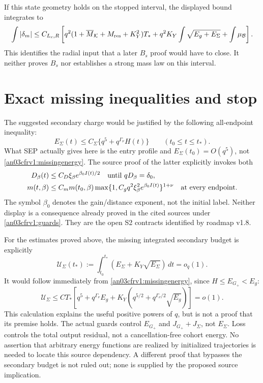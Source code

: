 \documentclass[11pt]{article}
\theoremstyle{remark}\newtheorem{remark}[proposition]{Remark}
\newcommand{\dd}{\,d}
\newcommand{\Gp}{G_+}
\newcommand{\KK}{\mathcal K}
\newcommand{\BB}{\mathcal B}
\begin{document}
If this state geometry holds on the stopped interval, the
displayed bound integrates to
\begin{equation}
 \int|\delta_m|\le C_{L_c,R}\left[
 q^2(1+\overline M_{\KK}+M_{\rm res}+K_Y^2)T_*
 +q^2K_Y\int\sqrt{E_g+E_\Sigma}
 +\int\mu_{\BB}\right].
 \label{an03cfrv1:radialintegral}
\end{equation}
This identifies the radial input that a later $B_s$ proof
would have to close. It neither proves $B_s$ nor establishes
a strong mass law on this interval.

\section{Exact missing inequalities and stop}
The suggested secondary charge would be justified by the
following all-endpoint inequality:
\begin{equation}
 \boxed{\quad E_\Sigma(t)\le
 C_\Sigma\{q^5+q^{\Gamma_\nu}H(t)\}
 \qquad(t_0\le t\le t_*).\quad}
 \label{an03cfrv1:missingenergy}
\end{equation}
What SEP actually gives here is the entry profile and
$E_\Sigma(t_0)=O(q^5)$, not
\eqref{an03cfrv1:missingenergy}.
The source proof of the latter explicitly invokes both
\begin{align}
 D_\beta(t)&\le C_D\xi_\beta e^{\beta_0I(t)/2}
       \quad\hbox{until }qD_\beta=\delta_0,\label{an03cfrv1:missingdistance}\\
 m(t,\beta)&\le C_m m(t_0,\beta)
       \max\{1,C_gq^2\xi_\beta^2e^{\beta_0I(t)}\}^{1+\nu}
       \quad\hbox{at every endpoint}.\label{an03cfrv1:missinggain}
\end{align}
The symbol $\beta_0$ denotes the gain/distance exponent, not
the initial label. Neither display is a consequence already
proved in the cited sources under \eqref{an03cfrv1:guards}.
They are the open S2 contracts identified by roadmap v1.8.

For the estimates proved above, the missing integrated
secondary budget is explicitly
\begin{equation}
 \boxed{\quad
 \mathcal U_\Sigma(t_*):=
 \int_{t_0}^{t_*}
       (E_\Sigma+K_Y\sqrt{E_\Sigma})\dd t=o_q(1).
 \quad}
 \label{an03cfrv1:missingintegral}
\end{equation}
It would follow immediately from
\eqref{an03cfrv1:missingenergy}, since $H\le E_{\Gp}<E_g$:
\[
 \mathcal U_\Sigma\le
 C T_*\left[q^5+q^{\Gamma_\nu}E_g
       +K_Y(q^{5/2}+q^{\Gamma_\nu/2}\sqrt{E_g})\right]=o(1).
\]
This calculation explains the useful positive powers of $q$,
but is not a proof that its premise holds.
The actual guards control $E_{\Gp}$ and $J_{\Gp}+J_\Sigma$,
not $E_\Sigma$. Loss controls the total output residual,
not a cancellation-free cohort energy. No assertion that
arbitrary energy functions are realized by initialized
trajectories is needed to locate this source dependency.
A different proof that bypasses the secondary budget is not
ruled out; none is supplied by the proposed source implication.
\end{document}
